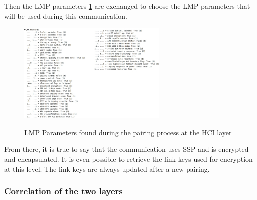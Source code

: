 Then the LMP parameters \ref{fig:lmp} are exchanged to choose the LMP parameters that will be used during this communication. 
\begin{figure}[!h]
  \begin{center}
	\includegraphics[width=270px]{images/LMP_PARAM.jpg}
	\label{fig:lmp}
	\caption{LMP Parameters found during the pairing process at the HCI layer}
  \end{center}
\end{figure}

From there, it is true to say that the communication uses SSP and is encrypted and encapsulated. It is even possible to retrieve the link keys used for encryption at this level. The link keys are always updated after a new pairing.

\subsubsection{Correlation of the two layers}

